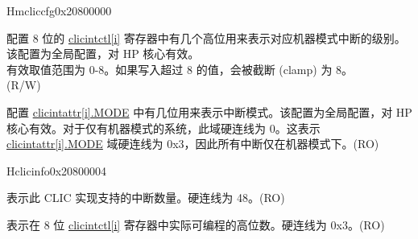 \begin{register}{H}{{mcliccfg}}{0x20800000}\label{regdesc:MCLICCFG_REG}
%
%
%
\regnewline%
\begin{regdesc}
\begin{reglist}
\label{fielddesc:MCLICCFG_MNLBITS}\item [MNLBITS] 配置 8 位的 \hyperref[regdesc:MCLICINTCTL_REG_i]{clicintctl[i]} 寄存器中有几个高位用来表示对应机器模式中断的级别。该配置为全局配置，对 HP 核心有效。\\
有效取值范围为 0-8。如果写入超过 8 的值，会被截断 (clamp) 为 8。 \\
(R/W)
\label{fielddesc:MCLICCFG_NMBITS}\item [NMBITS] 配置 \hyperref[fielddesc:MCLICINTATTR_i_MODE]{clicintattr[i].MODE} 中有几位用来表示中断模式。该配置为全局配置，对 HP 核心有效。对于仅有机器模式的系统，此域硬连线为 0。这表示 \hyperref[fielddesc:MCLICINTATTR_i_MODE]{clicintattr[i].MODE} 域硬连线为 0x3，因此所有中断仅在机器模式下。(RO) \\
\end{reglist}
\end{regdesc}
\end{register}


\begin{register}{H}{{clicinfo}}{0x20800004}\label{regdesc:CLICINFO_REG}
%
%
%
%
\regnewline%
\begin{regdesc}
\begin{reglist}
\label{fielddesc:CLICINFO_NUM_INTERRUPTS}\item [NUM\_INTERRUPTS] 表示此 CLIC 实现支持的中断数量。硬连线为 48。(RO)
\label{fielddesc:CLICINFO_CLICINTCTLBITS}\item [CLICINTCTLBITS] 表示在 8 位 \hyperref[regdesc:MCLICINTCTL_REG_i]{clicintctl[i]} 寄存器中实际可编程的高位数。硬连线为 0x3。(RO)
\end{reglist}
\end{regdesc}
\end{register}


